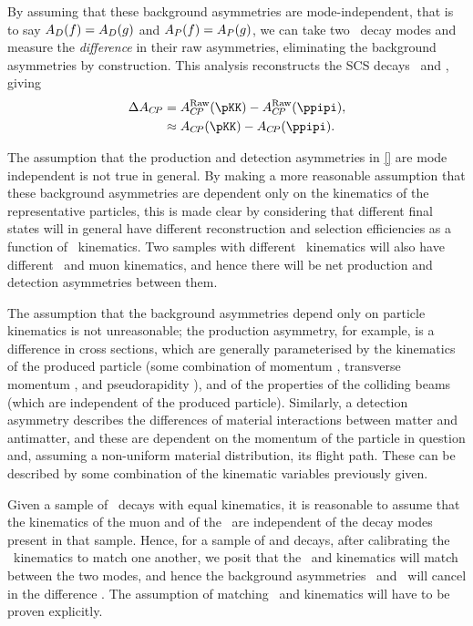 
By assuming that these background asymmetries are mode-independent, that is to 
say $A_{D}(f) = A_{D}(g)$ and $A_{P}(f) = A_{P}(g)$, we can take two \PLambdac\ decay 
modes and measure the \emph{difference} in their raw asymmetries, eliminating 
the background asymmetries by construction.
This analysis reconstructs the \ac{SCS} decays \LcTopKK\ and \LcToppipi, giving
\begin{align}
  \dACP &= \ARaw(\pKK) - \ARaw(\ppipi),\\
        &\approx \ACP(\pKK) - \ACP(\ppipi)\nonumber.
  \label{eqn:cpv:theory:dacp}
\end{align}

The assumption that the production and detection asymmetries in \cref{} are 
mode independent is not true in general.
By making a more reasonable assumption that these background asymmetries are 
dependent only on the kinematics of the representative particles, this is made 
clear by considering that different final states will in general have different 
reconstruction and selection efficiencies as a function of \PLambdac\ 
kinematics.
Two samples with different \PLambdac\ kinematics will also have different 
\PLambdab\ and muon kinematics, and hence there will be net production and 
detection asymmetries between them.

The assumption that the background asymmetries depend only on particle 
kinematics is not unreasonable; the production asymmetry, for example, is a 
difference in cross sections, which are generally parameterised by the 
kinematics of the produced particle (some combination of momentum \ptot, 
transverse momentum \pT, and pseudorapidity \Eta), and of the properties of the 
colliding beams (which are independent of the produced particle).
Similarly, a detection asymmetry describes the differences of material 
interactions between matter and antimatter, and these are dependent on the 
momentum of the particle in question and, assuming a non-uniform material 
distribution, its flight path.
These can be described by some combination of the kinematic variables 
previously given.

Given a sample of \PLambdac\ decays with equal kinematics, it is reasonable to 
assume that the kinematics of the muon and of the \PLambdab\ are independent of 
the decay modes present in that sample.
Hence, for a sample of \LcTopKK and \LcToppipi decays, after calibrating the 
\PLambdac\ kinematics to match one another, we posit that the \PLambdab\ and 
\Pmuon kinematics will match between the two modes, and hence the background 
asymmetries \AP\ and \ADmu\ will cancel in the difference \dACP\@.
The assumption of matching \PLambdab\ and \Pmuon kinematics will have to be 
proven explicitly.

